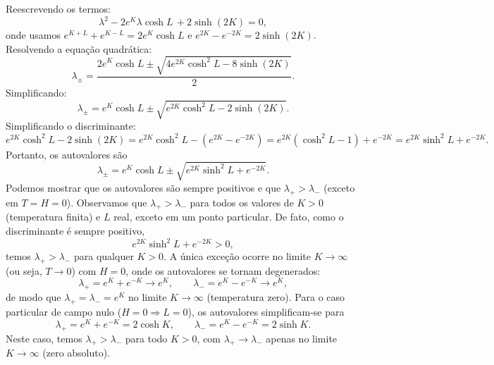 \documentclass[11pt,a4paper]{article}
\begin{document}
%
Reescrevendo os termos:
%
\begin{equation}
\lambda^2 - 2e^K \lambda\cosh L \,  + 2\sinh(2K) = 0,
\end{equation}
%
onde usamos $e^{K+L} + e^{K-L} = 2e^K \cosh L$ e $e^{2K} - e^{-2K} = 2\sinh(2K)$.
%
Resolvendo a equação quadrática:
%
\begin{equation}
\lambda_\pm = \frac{2e^K \cosh L \pm \sqrt{4e^{2K}\cosh^2 L - 8\sinh(2K)}}{2}.
\end{equation}
%
Simplificando:
%
\begin{equation}
\lambda_\pm = e^K \cosh L \pm \sqrt{e^{2K}\cosh^2 L - 2\sinh(2K)}.
\end{equation}
%
Simplificando o discriminante:
%
\begin{equation}
e^{2K}\cosh^2 L - 2\sinh(2K)
= e^{2K}\cosh^2 L - (e^{2K} - e^{-2K})
= e^{2K}(\cosh^2 L - 1) + e^{-2K}
= e^{2K}\sinh^2 L + e^{-2K}.
\end{equation}
%
Portanto, os autovalores são
%
\begin{equation}
\lambda_\pm
=
e^K \cosh L
\pm
\sqrt{ e^{2K}\sinh^2 L + e^{-2K}}.
\label{eq:autovalores_finais}
\end{equation}
%
Podemos mostrar que os autovalores são sempre positivos e que $\lambda_+ > \lambda_-$ (exceto em $T=H=0$). Observamos que $\lambda_+ > \lambda_-$ para todos os valores de $K > 0$ (temperatura finita) e $L$ real, exceto em um ponto particular. De fato, como o discriminante é sempre positivo,
%
\begin{equation}
e^{2K}\sinh^2 L + e^{-2K} > 0,
\end{equation}
%
temos $\lambda_+ > \lambda_-$ para qualquer $K > 0$. A única exceção ocorre no limite $K \to \infty$ (ou seja, $T \to 0$) com $H = 0$, onde os autovalores se tornam degenerados:
%
\begin{equation}
\lambda_+ = e^K + e^{-K} \longrightarrow e^K, \qquad
\lambda_- = e^K - e^{-K} \longrightarrow e^K,
\end{equation}
%
de modo que $\lambda_+ = \lambda_- = e^K$ no limite $K \to \infty$ (temperatura zero). Para o caso particular de campo nulo ($H = 0 \Rightarrow L = 0$), os autovalores simplificam-se para
%
\begin{equation}
\lambda_+ = e^K + e^{-K} = 2\cosh K, \qquad
\lambda_- = e^K - e^{-K} = 2\sinh K.
\label{eq:autovalores_h0}
\end{equation}
%
Neste caso, temos $\lambda_+ > \lambda_-$ para todo $K > 0$, com $\lambda_+ \to \lambda_-$ apenas no limite $K \to \infty$ (zero absoluto). 
\end{document}
